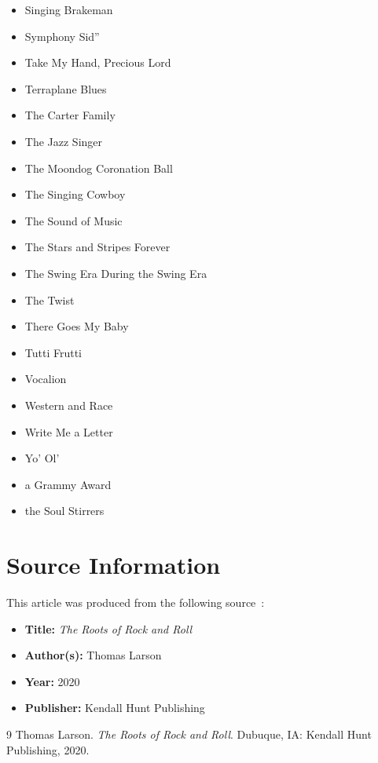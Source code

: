 \documentclass[12pt,a4paper]{article}
\begin{document}
\begin{itemize}
  \item Singing Brakeman
  \item Symphony Sid''
  \item Take My Hand, Precious Lord
  \item Terraplane Blues
  \item The Carter Family
  \item The Jazz Singer
  \item The Moondog Coronation Ball
  \item The Singing Cowboy
  \item The Sound of Music
  \item The Stars and Stripes Forever
  \item The Swing Era During the Swing Era
  \item The Twist
  \item There Goes My Baby
  \item Tutti Frutti
  \item Vocalion
  \item Western and Race
  \item Write Me a Letter
  \item Yo' Ol'
  \item a Grammy Award
  \item the Soul Stirrers
\end{itemize}


\section{Source Information}

This article was produced from the following
source~\cite{larson2020}:

\begin{itemize}
  \item \textbf{Title:} \textit{The Roots of Rock and Roll}
  \item \textbf{Author(s):} Thomas Larson
  \item \textbf{Year:} 2020
  \item \textbf{Publisher:} Kendall Hunt Publishing
\end{itemize}

\begin{thebibliography}{9}
Thomas Larson.
\textit{The Roots of Rock and Roll}.
Dubuque, IA: Kendall Hunt Publishing, 2020.
\end{thebibliography}
\end{document}
